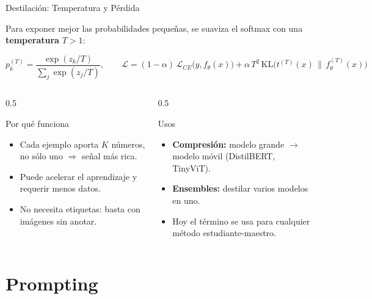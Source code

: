 \documentclass[aspectratio=169, 10pt]{beamer}
\newcommand{\formula}[1]{%
	\begin{tcolorbox}[colback=UCMBlue!8, colframe=UCMBlue, arc=4pt,
		boxsep=2pt, left=6pt, right=6pt, top=3pt, bottom=3pt]
		#1
	\end{tcolorbox}
}
\begin{document}
\begin{frame}{Destilaci\'on: Temperatura y P\'erdida}

	Para exponer mejor las probabilidades peque\~nas, se suaviza el softmax con una \textbf{temperatura} $T > 1$:

	\formula{
		\[
		p_k^{(T)} = \frac{\exp(z_k / T)}{\sum_{j} \exp(z_j / T)}, \qquad
		\mathcal{L} = (1-\alpha)\, \mathcal{L}_{CE}\big(y, f_\theta(x)\big) + \alpha\, T^2\, \mathrm{KL}\big(t^{(T)}(x) \,\|\, f^{(T)}_\theta(x)\big)
		\]
	}

	\begin{columns}[T]
		\begin{column}{0.5\textwidth}
			\begin{block}{Por qu\'e funciona}
				\small
				\begin{itemize}
					\item Cada ejemplo aporta $K$ n\'umeros, no s\'olo uno $\Rightarrow$ se\~nal m\'as rica.
					\item Puede acelerar el aprendizaje y requerir menos datos.
					\item No necesita etiquetas: basta con im\'agenes sin anotar.
				\end{itemize}
			\end{block}
		\end{column}

		\begin{column}{0.5\textwidth}
			\begin{block}{Usos}
				\small
				\begin{itemize}
					\item \textbf{Compresi\'on:} modelo grande $\to$ modelo m\'ovil (DistilBERT, TinyViT).
					\item \textbf{Ensembles:} destilar varios modelos en uno.
					\item Hoy el t\'ermino se usa para cualquier m\'etodo estudiante-maestro.
				\end{itemize}
			\end{block}
		\end{column}
	\end{columns}

\end{frame}

\section{Prompting}
\end{document}
